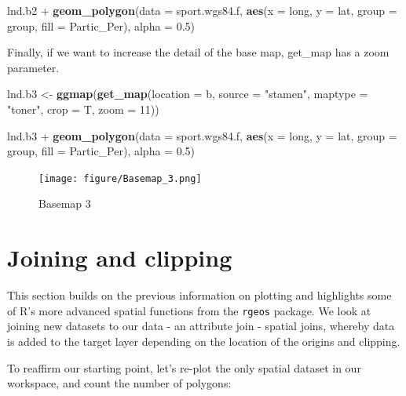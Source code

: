 \documentclass[]{article}
\newenvironment{Shaded}{}{}
\newcommand{\KeywordTok}[1]{\textcolor[rgb]{0.00,0.44,0.13}{\textbf{{#1}}}}
\newcommand{\DataTypeTok}[1]{\textcolor[rgb]{0.56,0.13,0.00}{{#1}}}
\newcommand{\DecValTok}[1]{\textcolor[rgb]{0.25,0.63,0.44}{{#1}}}
\newcommand{\FloatTok}[1]{\textcolor[rgb]{0.25,0.63,0.44}{{#1}}}
\newcommand{\StringTok}[1]{\textcolor[rgb]{0.25,0.44,0.63}{{#1}}}
\newcommand{\NormalTok}[1]{{#1}}
\begin{document}
\begin{Shaded}
\begin{Highlighting}[]
\NormalTok{lnd.b2 + }\KeywordTok{geom_polygon}\NormalTok{(}\DataTypeTok{data =} \NormalTok{sport.wgs84.f, }\KeywordTok{aes}\NormalTok{(}\DataTypeTok{x =} \NormalTok{long, }\DataTypeTok{y =} \NormalTok{lat, }\DataTypeTok{group =} \NormalTok{group, }
    \DataTypeTok{fill =} \NormalTok{Partic_Per), }\DataTypeTok{alpha =} \FloatTok{0.5}\NormalTok{)}
\end{Highlighting}
\end{Shaded}
Finally, if we want to increase the detail of the base map, get\_map has
a zoom parameter.

\begin{Shaded}
\begin{Highlighting}[]
\NormalTok{lnd.b3 <- }\KeywordTok{ggmap}\NormalTok{(}\KeywordTok{get_map}\NormalTok{(}\DataTypeTok{location =} \NormalTok{b, }\DataTypeTok{source =} \StringTok{"stamen"}\NormalTok{, }\DataTypeTok{maptype =} \StringTok{"toner"}\NormalTok{, }
    \DataTypeTok{crop =} \NormalTok{T, }\DataTypeTok{zoom =} \DecValTok{11}\NormalTok{))}

\NormalTok{lnd.b3 + }\KeywordTok{geom_polygon}\NormalTok{(}\DataTypeTok{data =} \NormalTok{sport.wgs84.f, }\KeywordTok{aes}\NormalTok{(}\DataTypeTok{x =} \NormalTok{long, }\DataTypeTok{y =} \NormalTok{lat, }\DataTypeTok{group =} \NormalTok{group, }
    \DataTypeTok{fill =} \NormalTok{Partic_Per), }\DataTypeTok{alpha =} \FloatTok{0.5}\NormalTok{)}
\end{Highlighting}
\end{Shaded}
\begin{figure}[htbp]
\centering
\texttt{[image: figure/Basemap\_3.png]}
\caption{Basemap 3}
\end{figure}

\section{Joining and clipping}

This section builds on the previous information on plotting and
highlights some of R's more advanced spatial functions from the
\texttt{rgeos} package. We look at joining new datasets to our data - an
attribute join - spatial joins, whereby data is added to the target
layer depending on the location of the origins and clipping.

To reaffirm our starting point, let's re-plot the only spatial dataset
in our workspace, and count the number of polygons:
\end{document}
